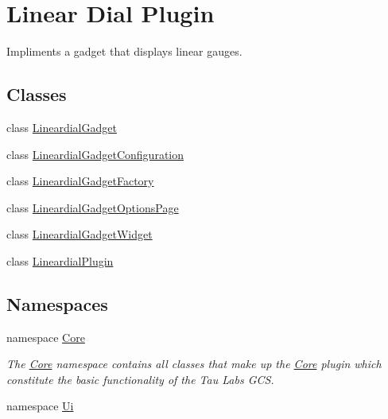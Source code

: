 \hypertarget{group___linear_dial_plugin}{\section{\-Linear \-Dial \-Plugin}
\label{group___linear_dial_plugin}
}


\-Impliments a gadget that displays linear gauges.  


\subsection*{\-Classes}
\begin{DoxyCompactItemize}
\item 
class \hyperlink{class_lineardial_gadget}{\-Lineardial\-Gadget}
\item 
class \hyperlink{class_lineardial_gadget_configuration}{\-Lineardial\-Gadget\-Configuration}
\item 
class \hyperlink{class_lineardial_gadget_factory}{\-Lineardial\-Gadget\-Factory}
\item 
class \hyperlink{class_lineardial_gadget_options_page}{\-Lineardial\-Gadget\-Options\-Page}
\item 
class \hyperlink{class_lineardial_gadget_widget}{\-Lineardial\-Gadget\-Widget}
\item 
class \hyperlink{class_lineardial_plugin}{\-Lineardial\-Plugin}
\end{DoxyCompactItemize}
\subsection*{\-Namespaces}
\begin{DoxyCompactItemize}
\item 
namespace \hyperlink{namespace_core}{\-Core}
\begin{DoxyCompactList}\small\item\em \-The \hyperlink{namespace_core}{\-Core} namespace contains all classes that make up the \hyperlink{namespace_core}{\-Core} plugin which constitute the basic functionality of the \-Tau \-Labs \-G\-C\-S. \end{DoxyCompactList}\item 
namespace \hyperlink{namespace_ui}{\-Ui}
\end{DoxyCompactItemize}
